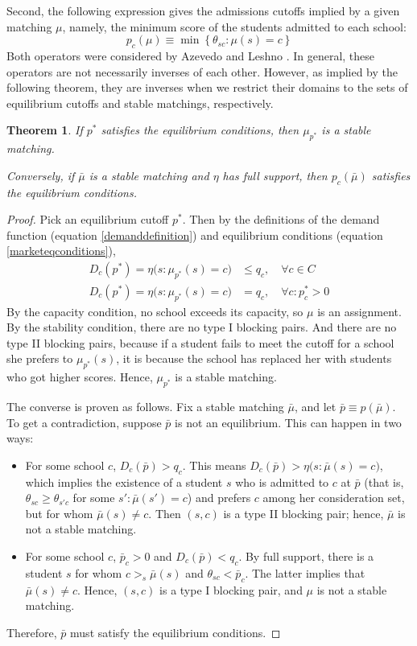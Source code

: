 \documentclass[12pt]{article}
\newtheorem{theorem}{Theorem}
\theoremstyle{definition}
\begin{document}
Second, the following expression gives the admissions cutoffs implied by a given matching $\mu$, namely, the minimum score of the students admitted to each school:
\[p_c(\mu) \equiv \min \left\{\theta_{sc}: \mu(s) = c\right\}\]
Both operators were considered by Azevedo and Leshno \parencite*{supplydemandfw}. In general, these operators are not necessarily inverses of each other. However, as implied by the following theorem, they are inverses when we restrict their domains to the sets of equilibrium cutoffs and stable matchings, respectively. 

\begin{theorem}If $p^*$ satisfies the equilibrium conditions, then $\mu_{p^*}$ is a stable matching. 

Conversely, if $\bar \mu$ is a stable matching and $\eta$ has full support, then $p_c(\bar \mu)$ satisfies the equilibrium conditions. \end{theorem}

\begin{proof}Pick an equilibrium cutoff $p^*$. Then by the definitions of the demand function (equation \eqref{demanddefinition}) and equilibrium conditions (equation \eqref{marketeqconditions}), 
\begin{align*}
D_c(p^*) = \eta\bigl(s: \mu_{p^*}(s) = c\bigr) &\leq q_c, \quad\forall c \in C \\
D_c(p^*) = \eta\bigl(s: \mu_{p^*}(s) = c\bigr) &= q_c, \quad \forall c: p_c^* > 0 
\end{align*}
By the capacity condition, no school exceeds its capacity, so $\mu$ is an assignment. By the stability condition, there are no type I blocking pairs. And there are no type II blocking pairs, because if a student fails to meet the cutoff for a school she prefers to $\mu_{p^*}(s)$, it is because the school has replaced her with students who got higher scores. Hence, $\mu_{p^*}$ is a stable matching.

The converse is proven as follows. Fix a stable matching $\bar \mu$, and let $\bar p \equiv p(\bar \mu)$. To get a contradiction, suppose $\bar p$ is not an equilibrium. This can happen in two ways:
\begin{itemize}
\item For some school $c$, $D_c( \bar p) > q_c$. This means $D_c( \bar p)  >  \eta\bigl(s: \bar \mu(s) = c\bigr) $, which implies the existence of a student $s$ who is admitted to $c$ at $\bar p$ (that is, $\theta_{sc} \geq \theta_{s'c}$ for some $s': \bar \mu(s') = c$) and prefers $c$ among her consideration set, but for whom $\bar \mu(s) \neq c$. Then $(s, c)$ is a type II blocking pair; hence, $\bar \mu$ is not a stable matching.
\item For some school $c$, $\bar p_c > 0$ and $D_c(\bar p) < q_c$. By full support, there is a student $s$ for whom $c >_s \bar \mu(s)$ and $\theta_{sc} < \bar p_c$. The latter implies that $\bar \mu(s) \neq c$. Hence, $(s, c)$ is a type I blocking pair, and $\mu$ is not a stable matching. 
\end{itemize}
Therefore, $\bar p$ must satisfy the equilibrium conditions.
\end{proof}
\end{document}
